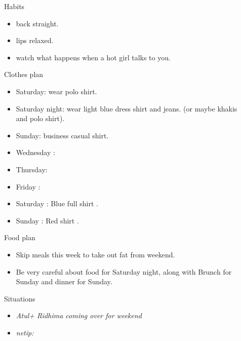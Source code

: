 \documentclass[serif, mathserif, final]{beamer}
\begin{document}
\begin{frame}{}
\begin{columns}
\begin{column}{0.25\linewidth}
  \begin{block}{ Habits } 
    \begin{itemize} 
      \tiny \item \tiny back straight. 
    \item \tiny lips relaxed. 
    \item \tiny watch what happens when a hot girl talks to you. 
    \end{itemize} 
  \end{block} 

  \begin{block}{ Clothes plan } 
    \begin{itemize} 
    \tiny \item \tiny Saturday: wear polo shirt. 
    \item \tiny Saturday night: wear light blue dress shirt and jeans. (or maybe khakis and polo shirt). 
    \item \tiny Sunday: business casual shirt. 
    \item \tiny Wednesday : 
    \item \tiny Thursday: 
    \item \tiny Friday : 
    \item \tiny Saturday : Blue full shirt . 
    \item \tiny Sunday : Red shirt .
    \end{itemize} 
  \end{block} 
  \begin{block}{ Food plan } 
    \begin{itemize} 
      \tiny \item \tiny Skip meals this week to take out fat from weekend. 
    \item \tiny Be very careful about food for Saturday night, along with Brunch for Sunday and dinner for Sunday. 
    \end{itemize} 
  \end{block} 

  \begin{block}{ Situations} 
    \begin{itemize} 
      \tiny \item \tiny \textit{Atul+ Ridhima coming over for weekend} 
    \item \tiny \textit{netip:} 
    \end{itemize}
  \end{block} 
\end{column} %
\begin{column}{0.50\linewidth}


\end{column}
\end{columns}
\end{frame}
\end{document}
